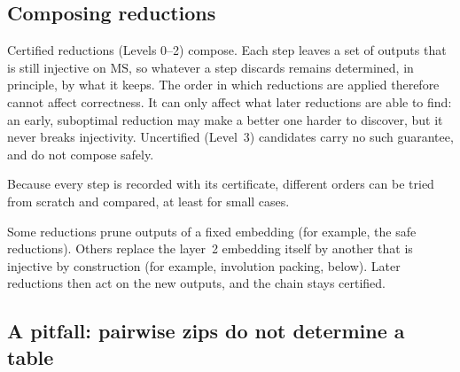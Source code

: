 \documentclass[11pt]{article}
\theoremstyle{definition}
\theoremstyle{remark}
\newcommand{\MS}{\mathrm{MS}}
\begin{document}
\subsection{Composing reductions}\label{sec:composition}

Certified reductions (Levels 0--2) compose. Each step leaves a set of outputs
that is still injective on $\MS$, so whatever a step discards remains
determined, in principle, by what it keeps. The order in which reductions are
applied therefore cannot affect correctness. It can only affect what later
reductions are able to find: an early, suboptimal reduction may make a better
one harder to discover, but it never breaks injectivity. Uncertified
(Level~3) candidates carry no such guarantee, and do not compose safely.

Because every step is recorded with its certificate, different orders can be
tried from scratch and compared, at least for small cases.

Some reductions prune outputs of a fixed embedding (for example, the safe
reductions). Others replace the layer~2 embedding itself by another that is
injective by construction (for example, involution packing, below). Later
reductions then act on the new outputs, and the chain stays certified.

\subsection{A pitfall: pairwise zips do not determine a table}\label{sec:pairwise}
\end{document}
